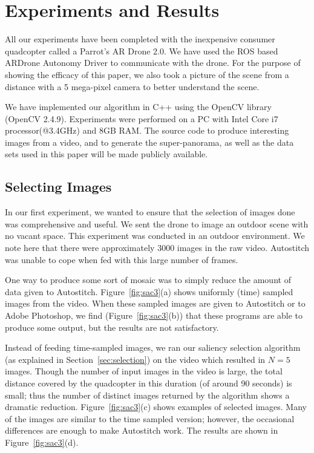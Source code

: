 \section{Experiments and Results}
\label{sec:results}

All our experiments have been completed with the inexpensive consumer
quadcopter called a Parrot's AR Drone 2.0. We have used the ROS based
ARDrone Autonomy Driver to communicate with the drone. For the purpose
of showing the efficacy of this paper, we also took a picture of the
scene from a distance with a 5 mega-pixel camera to better understand
the scene.

We have implemented our algorithm in C++ using the OpenCV library
(OpenCV 2.4.9). Experiments were performed on a PC with Intel Core i7
processor(@3.4GHz) and 8GB RAM.  The source code to produce
interesting images from a video, and to generate the super-panorama,
as well as the data sets used in this paper will be made publicly
available.

\subsection{Selecting Images}

In our first experiment, we wanted to ensure that the selection of
images done was comprehensive and useful.  We sent the drone to image 
an outdoor scene with no vacant space. This experiment was conducted
in an outdoor environment. We note here that there were approximately
3000 images in the raw video.  Autostitch was unable to cope  when fed
with this large number of frames.

One way to produce some sort of mosaic was to simply reduce the amount
of data given to Autostitch.  Figure~\ref{fig:sac3}(a) shows uniformly
(time) sampled images from the video.  When these sampled images are
given to Autostitch or to Adobe Photoshop, we find
(Figure~\ref{fig:sac3}(b)) that these programs are able to produce
some output, but the results are not satisfactory.

Instead of feeding time-sampled images, we ran our saliency selection
algorithm (as explained in Section~\ref{sec:selection}) on the video
which resulted in $N = 5$ images.  Though the number of input images
in the video is large, the total distance covered by the quadcopter in
this duration (of around 90 seconds) is small; thus the
number of distinct images returned by the algorithm shows a dramatic
reduction. Figure~\ref{fig:sac3}(c) shows examples of selected images.
Many of the images are similar to the time sampled version; however,
the occasional differences are enough to make Autostitch work. The
results are shown in Figure~\ref{fig:sac3}(d).


